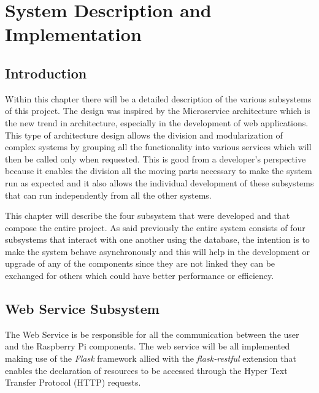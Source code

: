 \chapter{System Description and Implementation}
\label{chap:sys-desc}

\section{Introduction}
\label{chap4:sec:intro}
Within this chapter there will be a detailed description of the various
subsystems of this project. The design was inspired by the Microservice
architecture which is the new trend in architecture, especially in the
development of web applications.
This type of architecture design allows the division and modularization of
complex systems by grouping all the functionality into various services which
will then be called only when requested. This is good from a developer's
perspective because it enables the division all the moving parts necessary to
make the system run as expected and it also allows the individual development of
these subsystems that can run independently from all the other systems.

This chapter will describe the four subsystem that were developed and that
compose the entire project. As said previously the entire system consists of
four subsystems that interact with one another using the database, the intention
is to make the system behave asynchronously and this will help in the
development or upgrade of any of the components since they are not linked they
can be exchanged for others which could have better performance or efficiency.

\section{Web Service Subsystem}
\label{chap4:sec:web-sys}

The Web Service is be responsible for all the communication between the user and
the Raspberry Pi components. The web service will be all implemented making use
of the \emph{Flask} framework allied with the \emph{flask-restful} extension
that enables the declaration of resources to be accessed through the Hyper Text
Transfer Protocol (HTTP) requests.

